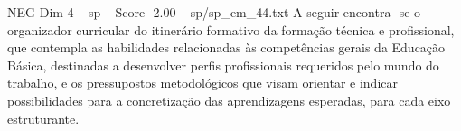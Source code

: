 \begin{textsample}{NEG Dim 4 – sp – Score -2.00 – sp/sp\_em\_44.txt}
A seguir encontra -se o organizador curricular do itinerário formativo da formação técnica e profissional, que contempla as habilidades relacionadas às competências gerais da Educação Básica, destinadas a desenvolver perfis profissionais requeridos pelo mundo do trabalho, e os pressupostos metodológicos que visam orientar e indicar possibilidades para a concretização das aprendizagens esperadas, para cada eixo estruturante.

\end{textsample}
